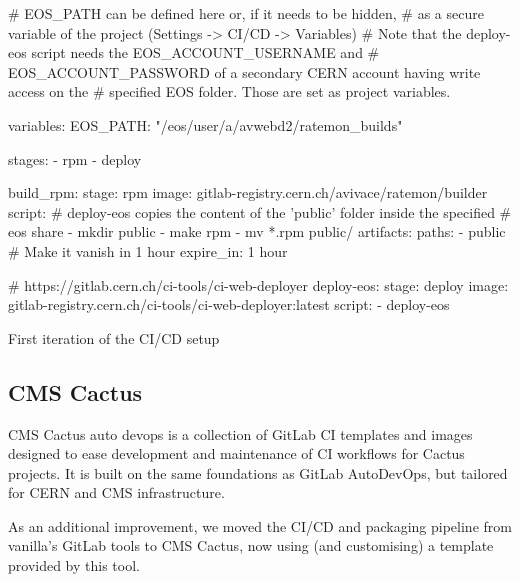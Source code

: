 \begin{listing}[ht]
\begin{yamlcode}

# EOS_PATH can be defined here or, if it needs to be hidden, 
# as a secure variable of the project (Settings -> CI/CD -> Variables)
# Note that the deploy-eos script needs the EOS_ACCOUNT_USERNAME and 
# EOS_ACCOUNT_PASSWORD of a secondary CERN account having write access on the
# specified EOS folder. Those are set as project variables.

variables:
  EOS_PATH: "/eos/user/a/avwebd2/ratemon_builds"

stages:
  - rpm
  - deploy

build_rpm:
  stage: rpm
  image: gitlab-registry.cern.ch/avivace/ratemon/builder
  script:
    # deploy-eos copies the content of the 'public' folder inside the specified
    # eos share
    - mkdir public
    - make rpm
    - mv *.rpm public/
  artifacts:
    paths:
      - public
    # Make it vanish in 1 hour
    expire_in: 1 hour

# https://gitlab.cern.ch/ci-tools/ci-web-deployer
deploy-eos:
  stage: deploy
  image: gitlab-registry.cern.ch/ci-tools/ci-web-deployer:latest
  script:
    - deploy-eos

\end{yamlcode}
\caption{First iteration of the CI/CD setup}
\end{listing}

\subsection{CMS Cactus}

CMS Cactus auto devops \cite{DirkxCactus} is a collection of GitLab CI templates and images designed to ease development and maintenance of CI workflows for Cactus projects. It is built on the same foundations as GitLab AutoDevOps, but tailored for CERN and CMS infrastructure.

As an additional improvement, we moved the CI/CD and packaging pipeline from vanilla’s GitLab tools to CMS Cactus, now using (and customising) a template provided by this tool.


